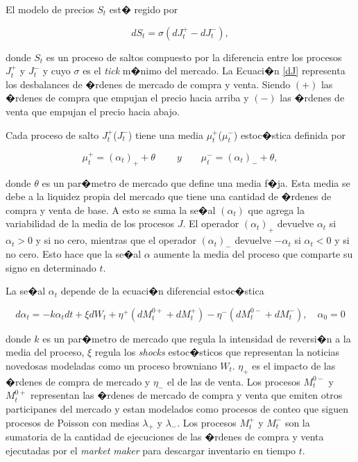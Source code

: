 \documentclass[12pt,a4paper,spanish]{article}%
\begin{document}
El modelo de precios $S_t$ est� regido por

\begin{equation}
	dS_t = \sigma (dJ_t^+ - dJ_t^-),
	\label{dJ}
\end{equation}

donde $S_t$ es un proceso de saltos compuesto por la diferencia entre los procesos $J_t^+$ y $J_t^-$ y cuyo $\sigma$ es el \textit{tick} m�nimo del mercado. La Ecuaci�n \ref{dJ} representa los desbalances de �rdenes de mercado de compra y venta. Siendo $(+)$ las �rdenes de compra que empujan el precio hacia arriba y $(-)$ las �rdenes de venta que empujan el precio hacia abajo.

Cada proceso de salto $J_t^+$($J_t^-$) tiene una media  $\mu_t^+$($\mu_t^-$) estoc�stica definida por

\begin{equation}
	\mu_t^+ = (\alpha_t)_+ + \theta\ \qquad \textit{y} \qquad
	\mu_t^- = (\alpha_t)_- + \theta ,
	\label{mu}
\end{equation}

donde $\theta$ es un par�metro de mercado que define una media f�ja. Esta media se debe a la liquidez propia del mercado que tiene una cantidad de �rdenes de compra y venta de base. A esto se suma la se�al $(\alpha_t)$ que agrega la variabilidad de la media de los procesos $J$. El operador $(\alpha_t)_{+}$ devuelve $\alpha_t$ si $\alpha_t>0$ y si no cero, mientras que el operador $(\alpha_t)_{-}$ devuelve $-\alpha_t$ si $\alpha_t<0$ y si no cero. Esto hace que la se�al $\alpha$ aumente la media del proceso que comparte su signo en determinado $t$.

La se�al $\alpha_t$ depende de la ecuaci�n diferencial estoc�stica

\begin{equation}
	d\alpha_t = -k\alpha_t dt + \xi dW_t + \eta^+ (dM_t^{0+} + dM_t^+) - \eta^- (dM_t^{0-} + dM_t^-), \quad \alpha_0=0
	\label{alpha_dif}
\end{equation}

 donde $k$ es un par�metro de mercado que regula la intensidad de reversi�n a la media del proceso, $\xi$ regula los \textit{shocks} estoc�sticos que representan la noticias novedosas modeladas como un proceso browniano $W_t$. $\eta_+$ es el impacto de las �rdenes de compra de mercado y $\eta_-$ el de las de venta. Los procesos $M_t^{0-}$ y $M_t^{0+}$ representan las �rdenes de mercado de compra y venta que emiten otros participanes del mercado y estan modelados como procesos de conteo que siguen procesos de Poisson con medias $\lambda_+$ y $\lambda_-$. Los procesos $M_t^{+}$ y $M_t^{-}$ son la sumatoria de la cantidad de ejecuciones de las �rdenes de compra y venta ejecutadas por el \textit{market maker} para descargar inventario en tiempo $t$.
\end{document}
